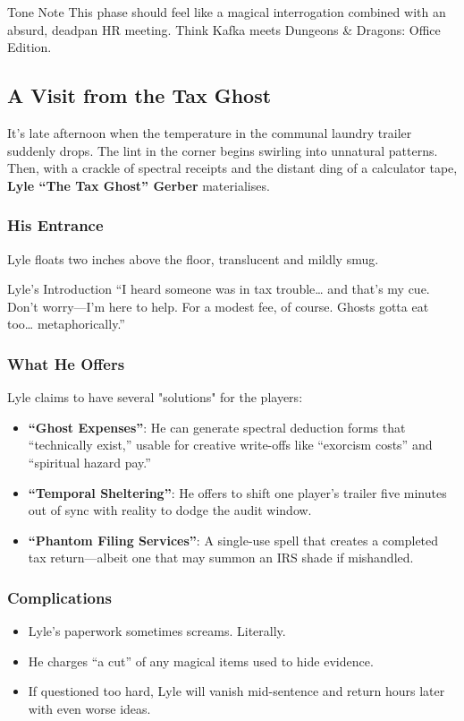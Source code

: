 \begin{multicols}{2}
\begin{CommentBox}{Tone Note}
    This phase should feel like a magical interrogation combined with an absurd, deadpan HR meeting. Think Kafka meets Dungeons \& Dragons: Office Edition.
\end{CommentBox}


\subsection{A Visit from the Tax Ghost}

It’s late afternoon when the temperature in the communal laundry trailer suddenly drops. The lint in the corner begins swirling into unnatural patterns. Then, with a crackle of spectral receipts and the distant ding of a calculator tape, \textbf{Lyle “The Tax Ghost” Gerber} materialises.

\subsubsection*{His Entrance}
Lyle floats two inches above the floor, translucent and mildly smug.

\begin{Example}{Lyle’s Introduction}
    “I heard someone was in tax trouble… and that’s my cue. Don’t worry—I’m here to help. For a modest fee, of course. Ghosts gotta eat too… metaphorically.”
\end{Example}

\subsubsection*{What He Offers}
Lyle claims to have several "solutions" for the players:
\begin{itemize}
    \item \textbf{“Ghost Expenses”}: He can generate spectral deduction forms that “technically exist,” usable for creative write-offs like “exorcism costs” and “spiritual hazard pay.”
    \item \textbf{“Temporal Sheltering”}: He offers to shift one player’s trailer five minutes out of sync with reality to dodge the audit window.
    \item \textbf{“Phantom Filing Services”}: A single-use spell that creates a completed tax return—albeit one that may summon an IRS shade if mishandled.
\end{itemize}

\subsubsection*{Complications}
\begin{itemize}
    \item Lyle’s paperwork sometimes screams. Literally.
    \item He charges “a cut” of any magical items used to hide evidence.
    \item If questioned too hard, Lyle will vanish mid-sentence and return hours later with even worse ideas.
\end{itemize}


\end{multicols}

